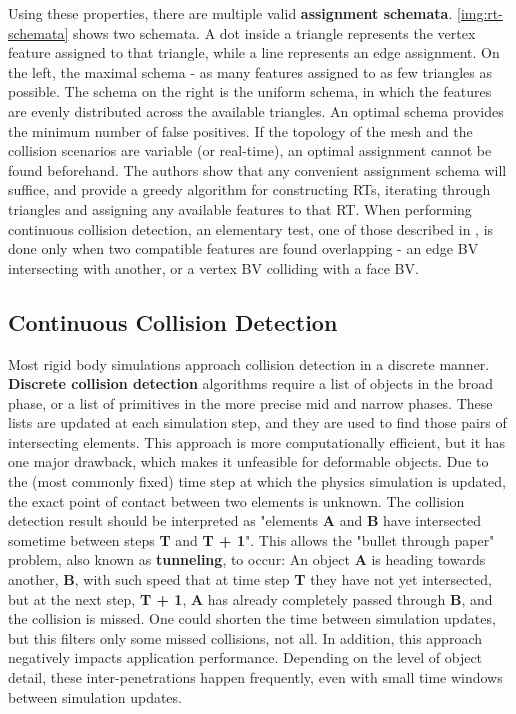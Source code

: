 Using these properties, there are multiple valid \textbf{assignment schemata}. \autoref{img:rt-schemata} shows two schemata. A dot inside a triangle represents the vertex feature assigned to that triangle, while a line represents an edge assignment. On the left, the maximal schema - as many features assigned to as few triangles as possible. The schema on the right is the uniform schema, in which the features are evenly distributed across the available triangles. An optimal schema provides the minimum number of false positives. If the topology of the mesh and the collision scenarios are variable (or real-time), an optimal assignment cannot be found beforehand. The authors show that any convenient assignment schema will suffice, and provide a greedy algorithm for constructing RTs, iterating through triangles and assigning any available features to that RT. When performing continuous collision detection, an elementary test, one of those described in \citep{provot97}, is done only when two compatible features are found overlapping - an edge BV intersecting with another, or a vertex BV colliding with a face BV.


\FloatBarrier
\subsection{Continuous Collision Detection}
\label{sub-sec:ccd}

Most rigid body simulations approach collision detection in a discrete manner. \textbf{Discrete collision detection} algorithms require a list of objects in the broad phase, or a list of primitives in the more precise mid and narrow phases. These lists are updated at each simulation step, and they are used to find those pairs of intersecting elements. This approach is more computationally efficient, but it has one major drawback, which makes it unfeasible for deformable objects. Due to the (most commonly fixed) time step at which the physics simulation is updated, the exact point of contact between two elements is unknown. The collision detection result should be interpreted as "elements \textbf{A} and \textbf{B} have intersected sometime between steps \textbf{T} and \textbf{T + 1}". This allows the "bullet through paper" problem, also known as \textbf{tunneling}, to occur: An object \textbf{A} is heading towards another, \textbf{B}, with such speed that at time step \textbf{T} they have not yet intersected, but at the next step, \textbf{T + 1}, \textbf{A} has already completely passed through \textbf{B}, and the collision is missed. One could shorten the time between simulation updates, but this filters only some missed collisions, not all. In addition, this approach negatively impacts application performance. Depending on the level of object detail, these inter-penetrations happen frequently, even with small time windows between simulation updates.

